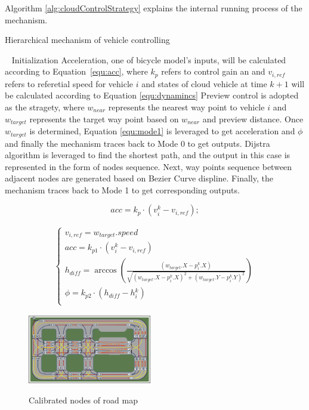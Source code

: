 \documentclass[conference]{IEEEtran}
\begin{document}
	Algorithm \ref{alg:cloudControlStrategy} explains the internal running process of the mechanism.
	\begin{algorithm}[htbp]
		\caption{Hierarchical mechanism of vehicle controlling}
		\LinesNumbered 
		\label{alg:cloudControlStrategy}
		Initialization\;
		{
			{
				Acceleration, one of bicycle model's inputs, will be calculated according to Equation~\ref{equ:acc}, where $k_p$ refers to control gain an and $v_{i,ref}$ refers to referetial speed for vehicle $i$ and states of cloud vehicle at time ${k+1}$ will be calculated according to Equation \ref{equ:dynamincs}\;
			}
			{
				Preview control is adopted as the stragety, where $w_{near}$ represents the nearest way point to vehicle $i$ and $w_{target}$ represents the target way point based on $w_{near}$ and preview distance. Once $w_{target}$ is determined, Equation \ref{equ:mode1} is leveraged to get acceleration and $\phi$ and finally the mechanism traces back to Mode 0 to get outputs.
			}
			{
				Dijstra algorithm is leveraged to find the shortest path, and the output in this case is represented in the form of nodes sequence. Next, way points sequence between adjacent nodes are generated based on Bezier Curve displine. Finally, the mechanism traces back to Mode 1 to get corresponding outputs. 
			}
		}
	\end{algorithm}
\begin{equation}
	\label{equ:acc}
	acc=k_p\cdot (v{_i^k}-v_{i,ref});
\end{equation}

\begin{eqnarray}
	\begin{cases}
		\label{equ:mode1}
		v_{i,ref}=w_{target}.speed\\
		acc=k_{p1}\cdot (v{_i^k}-v_{i,ref})\\
		h_{diff}=\arccos(\frac{(w_{target}.X-p{_i^k}.X)}{\sqrt{(w_{target}.X-p{_i^k}.X)^2+(w_{target}.Y-p{_i^k}.Y)^2}})\\
		\phi=k_{p2}\cdot (h_{diff}-h{_i^k})\\
\end{cases}
\end{eqnarray}

\begin{figure}[htbp]
	\includegraphics[width=0.48\textwidth]{figure/nodes.png}
	\label{fig:calibratedNodes}
	\caption{Calibrated nodes of road map}
\end{figure}
\end{document}
